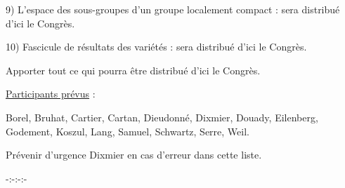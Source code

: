 9) L'espace des sous-groupes d'un groupe localement compact : sera distribué d'ici le Congrès.

10) Fascicule de résultats des variétés : sera distribué d'ici le Congrès.

Apporter tout ce qui pourra être distribué d'ici le Congrès.

\uline{Participants prévus} :

Borel, Bruhat, Cartier, Cartan, Dieudonné, Dixmier, Douady, Eilenberg, Godement, Koszul, Lang, Samuel, Schwartz, Serre, Weil.

Prévenir d'urgence Dixmier en cas d'erreur dans cette liste.

\begin{center}-:-:-:-\end{center}
